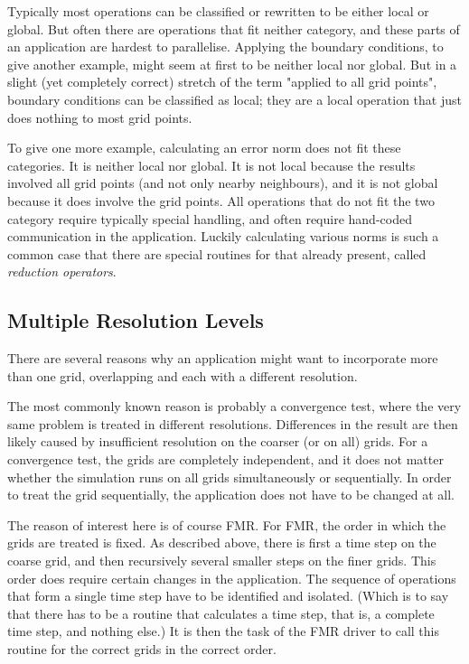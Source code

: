 Typically most operations can be classified or rewritten to be either
local or global.  But often there are operations that fit neither
category, and these parts of an application are hardest to
parallelise.  Applying the boundary conditions, to give another
example, might seem at first to be neither local nor global.  But in a
slight (yet completely correct) stretch of the term "applied to all
grid points", boundary conditions can be classified as local; they are
a local operation that just does nothing to most grid points.

To give one more example, calculating an error norm does not fit these
categories.  It is neither local nor global.  It is not local because
the results involved all grid points (and not only nearby neighbours),
and it is not global because it does involve the grid points.  All
operations that do not fit the two category require typically special
handling, and often require hand-coded communication in the
application.  Luckily calculating various norms is such a common case
that there are special routines for that already present, called
\emph{reduction operators}.

\subsection{Multiple Resolution Levels}

There are several reasons why an application might want to incorporate
more than one grid, overlapping and each with a different resolution.

The most commonly known reason is probably a convergence test, where
the very same problem is treated in different resolutions.
Differences in the result are then likely caused by insufficient
resolution on the coarser (or on all) grids.  For a convergence test,
the grids are completely independent, and it does not matter whether
the simulation runs on all grids simultaneously or sequentially.  In
order to treat the grid sequentially, the application does not have to
be changed at all.

The reason of interest here is of course FMR.  For FMR, the order in
which the grids are treated is fixed.  As described above, there is
first a time step on the coarse grid, and then recursively several
smaller steps on the finer grids.  This order does require certain
changes in the application.  The sequence of operations that form a
single time step have to be identified and isolated.  (Which is to say
that there has to be a routine that calculates a time step, that is, a
complete time step, and nothing else.)  It is then the task of the FMR
driver to call this routine for the correct grids in the correct
order.

